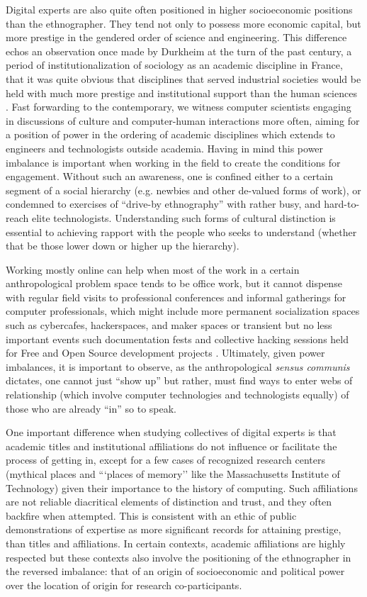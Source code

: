 \documentclass[10pt,letter,oneside]{scrartcl}
\begin{document}
Digital experts are also quite often positioned in higher
socioeconomic positions than the ethnographer. They tend not only to
possess more economic capital, but more prestige in the gendered order
of science and engineering. This difference echos an observation once
made by Durkheim at the turn of the past century, a period of
institutionalization of sociology as an academic discipline in France,
that it was quite obvious that disciplines that served industrial
societies would be held with much more prestige and institutional
support than the human sciences \cite{Durkheim??}. Fast forwarding to
the contemporary, we witness computer scientists engaging in
discussions of culture and computer-human interactions more often,
aiming for a position of power in the ordering of academic disciplines
which extends to engineers and technologists outside academia. Having
in mind this power imbalance is important when working in the field to
create the conditions for engagement.  Without such an awareness, one
is confined either to a certain segment of a social hierarchy
(e.g. newbies and other de-valued forms of work), or condemned to
exercises of ``drive-by ethnography'' with rather busy, and
hard-to-reach elite technologists.  Understanding such forms of
cultural distinction is essential to achieving rapport with the people
who seeks to understand (whether that be those lower down or higher up
the hierarchy).  

Working mostly online can help when most of the work in a certain
anthropological problem space tends to be office work, but it cannot
dispense with regular field visits to professional conferences and
informal gatherings for computer professionals, which might include
more permanent socialization spaces such as cybercafes, hackerspaces,
and maker spaces or transient but no less important events such
documentation fests and collective hacking sessions held for Free and
Open Source development projects
\cite{Coleman2010,Burrell2012}. Ultimately, given power imbalances, it
is important to observe, as the anthropological \emph{sensus communis}
dictates, one cannot just ``show up'' but rather, must find ways to
enter webs of relationship (which involve computer technologies and
technologists equally) of those who are already ``in'' so to speak.

One important difference when studying collectives of digital experts
is that academic titles and institutional affiliations do not
influence or facilitate the process of getting in, except for a few
cases of recognized research centers (mythical places and ```places of
memory'' like the Massachusetts Institute of Technology) given their importance to the history of
computing. Such affiliations are not reliable diacritical elements of
distinction and trust, and they often backfire when attempted.  This
is consistent with an ethic of public demonstrations of expertise as more
significant records for attaining prestige, than titles and
affiliations. In certain contexts, academic affiliations are highly
respected but these contexts also involve the positioning of the
ethnographer in the reversed imbalance: that of an origin of
socioeconomic and political power over the location of origin for
research co-participants.
\end{document}
